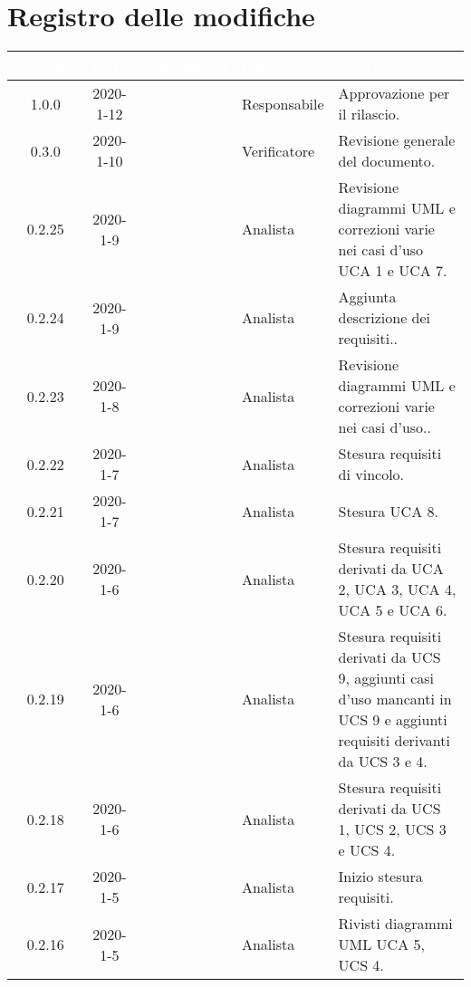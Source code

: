 \section*{Registro delle modifiche}
{
\renewcommand{\arraystretch}{1.5}
\centering
\begin{longtable}{ c c  C{4cm}  C{3cm} C{4cm}}
   \textcolor{white}{\textbf{Versione}} &
   \textcolor{white}{\textbf{Data}}&
   \textcolor{white}{\textbf{Nominativo}}&
   \textcolor{white}{\textbf{Ruolo}}&
   \textcolor{white}{\textbf{Descrizione}}\\
   \endhead


1.0.0 & 2020-1-12 & \AT{} & Responsabile & Approvazione per il rilascio. \\

0.3.0 & 2020-1-10 & \SE{} & Verificatore & Revisione generale del documento. \\

0.2.25 & 2020-1-9 & \PF{} & Analista & Revisione diagrammi UML e correzioni varie nei casi d'uso UCA 1 e UCA 7. \\

0.2.24 & 2020-1-9 & \CE{} & Analista & Aggiunta descrizione dei requisiti.. \\

0.2.23 & 2020-1-8 & \CE{} & Analista & Revisione diagrammi UML e correzioni varie nei casi d'uso.. \\

0.2.22 & 2020-1-7 & \PF{} & Analista & Stesura requisiti di vincolo. \\

0.2.21 & 2020-1-7 & \PF{} & Analista & Stesura UCA 8. \\

0.2.20 & 2020-1-6 & \PF{} & Analista & Stesura requisiti derivati da UCA 2, UCA 3, UCA 4, UCA 5 e UCA 6. \\

0.2.19 & 2020-1-6 & \DF{} & Analista & Stesura requisiti derivati da UCS 9, aggiunti casi d'uso mancanti in UCS 9 e aggiunti requisiti derivanti da UCS 3 e 4. \\

0.2.18 & 2020-1-6 & \CE{} & Analista & Stesura requisiti derivati da UCS 1, UCS 2, UCS 3 e UCS 4. \\

0.2.17 & 2020-1-5 & \CE{} & Analista & Inizio stesura requisiti. \\

0.2.16 & 2020-1-5 & \DF{} & Analista & Rivisti diagrammi UML UCA 5, UCS 4. \\


\end{longtable}}
